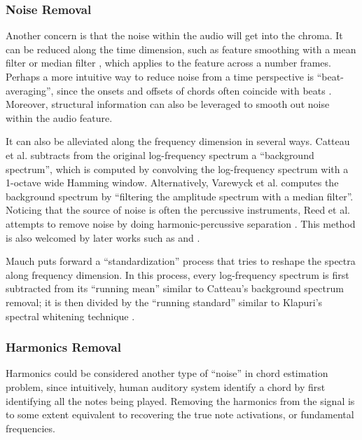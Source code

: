 \subsubsection{Noise Removal}
Another concern is that the noise within the audio will get into the chroma. It can be reduced along the time dimension, such as feature smoothing with a mean filter \cite{harte2005automatic,humphrey2012rethinking} or median filter \cite{khadkevich2009use,mauch2008discrete}, which applies to the feature across a number frames. Perhaps a more intuitive way to reduce noise from a time perspective is ``beat-averaging''\cite{bello2005robust,mauch2010approximate}, since the onsets and offsets of chords often coincide with beats \cite{goto1999real}. Moreover, structural information can also be leveraged \cite{mauch2009using,cho2011feature,cho2014improved} to smooth out noise within the audio feature.

It can also be alleviated along the frequency dimension in several ways. Catteau et al. \cite{catteau2007probabilistic} subtracts from the original log-frequency spectrum a ``background spectrum'', which is computed by convolving the log-frequency spectrum with a 1-octave wide Hamming window. Alternatively, Varewyck et al. \cite{varewyck2008novel} computes the background spectrum by ``filtering the amplitude spectrum with a median filter''. Noticing that the source of noise is often the percussive instruments, Reed et al. \cite{reed2009minimum} attempts to remove noise by doing harmonic-percussive separation \cite{ono2008separation}. This method is also welcomed by later works such as \cite{ni2012end} and \cite{ueda2010hmm}.

Mauch \cite{mauch2010automatic} puts forward a ``standardization'' process that tries to reshape the spectra along frequency dimension. In this process, every log-frequency spectrum is first subtracted from its ``running mean'' similar to Catteau's background spectrum removal; it is then divided by the ``running standard'' similar to Klapuri's spectral whitening technique \cite{klapuri2006multiple}.

\subsubsection{Harmonics Removal}
Harmonics could be considered another type of ``noise'' in chord estimation problem, since intuitively, human auditory system identify a chord by first identifying all the notes being played. Removing the harmonics from the signal is to some extent equivalent to recovering the true note activations, or fundamental frequencies.

